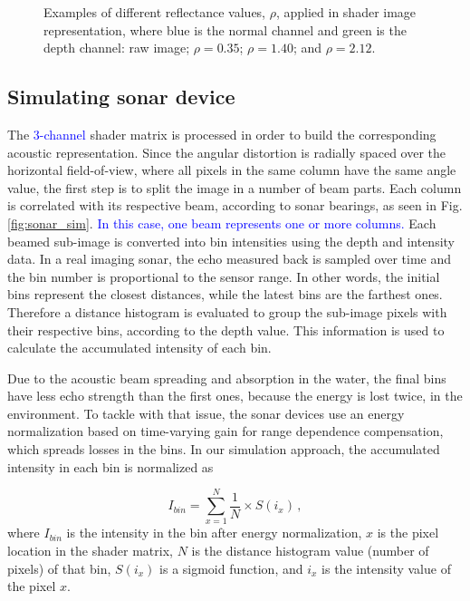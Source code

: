 \documentclass[final,5p,times]{elsarticle}
\begin{document}
\begin{figure}[h]
{        \label{fig:reflectance:2.12}
    }
    \captionsetup{justification=centering}
    \caption{Examples of different reflectance values, $\rho$, applied in
    shader image representation, where blue is the normal channel and
    green is the depth channel:  raw image;
     $\rho = 0.35$;
     $\rho = 1.40$; and
     $\rho = 2.12$.}
    \label{fig:sonar_reflectances}
\end{figure}



\subsection{Simulating sonar device}
\label{dev:sonardata}

The \textcolor{blue}{3-channel} shader matrix is processed in order to build the corresponding
acoustic representation. Since the angular distortion is radially spaced
over the horizontal field-of-view, where all pixels in the same column
have the same angle value, the first step is to split the image in a
number of beam parts. Each column is correlated with its respective beam,
according to sonar bearings, as seen in Fig. \ref{fig:sonar_sim}.
\textcolor{blue}{In this case, one beam represents one or more columns.} Each
beamed sub-image is converted into bin intensities using the depth and
intensity data. In a real imaging sonar, the echo measured back is sampled
over time and the bin number is proportional to the sensor range. In other
words, the initial bins represent the closest distances, while the latest
bins are the farthest ones. Therefore a distance histogram is evaluated to
group the sub-image pixels with their respective bins, according to the
depth value. This information is used to calculate the accumulated
intensity of each bin.

Due to the acoustic beam spreading and absorption in the water, the final
bins have less echo strength than the first ones, because the energy is
lost twice, in the environment. To tackle with that issue, the sonar devices
use an energy normalization based on time-varying gain for range dependence
compensation, which spreads losses in the bins. In our simulation approach,
the accumulated intensity in each bin is normalized as

\begin{equation}
    \label{eq:1}
    I_{bin} = \sum\limits_{x=1}^N \frac{1}{N} \times S(i_{x}) \, ,
\end{equation}
where $I_{bin}$ is the intensity in the bin after energy normalization,
$x$ is the pixel location in the shader matrix, $N$ is the distance histogram
value (number of pixels) of that bin, $S(i_{x})$ is a sigmoid function,
and $i_{x}$ is the intensity value of the pixel $x$.
\end{document}

